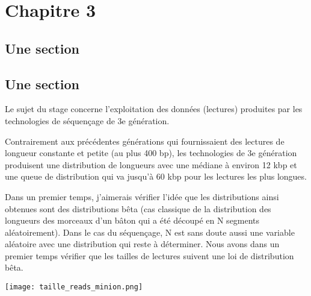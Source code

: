 \documentclass{book}
\begin{document}
	\chapter{Chapitre 3}
		\section{Une section}
		\section{Une section}

\setcounter{tocdepth}{4}

\renewcommand{\contentsname}{Sommaire} %

\tableofcontents





Le  sujet du stage concerne l'exploitation des données (lectures)
produites par les technologies de séquençage de 3e génération.

Contrairement aux précédentes générations qui fournissaient des lectures
de longueur constante et petite (au plus 400 bp), les technologies de 3e
génération produisent une distribution de longueurs avec une médiane à
environ 12 kbp et une queue de distribution qui va jusqu'à 60 kbp pour les
lectures les plus longues.

Dans un premier temps, j'aimerais vérifier l'idée que les distributions ainsi obtenues sont des distributions bêta (cas classique de la distribution
des longueurs des morceaux d'un bâton qui a été découpé en N segments
aléatoirement). Dans le cas du séquençage, N est sans doute aussi une
variable aléatoire avec une distribution qui reste à déterminer.
Nous avons dans un premier temps vérifier que les tailles de lectures suivent une loi de distribution bêta.

\texttt{[image: taille\_reads\_minion.png]} 
\end{document}
